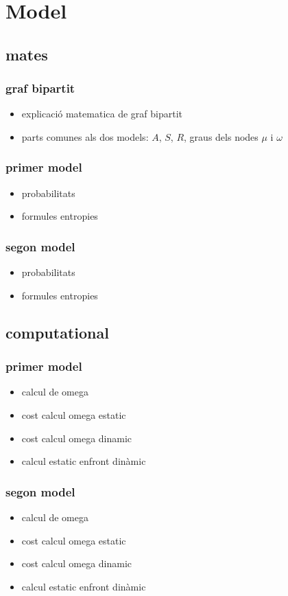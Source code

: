 \chapter{Model}
\section{mates}
\subsection{graf bipartit}
\begin{itemize}
\item explicació matematica de graf bipartit
\item parts comunes als dos models: $A$, $S$, $R$, graus dels nodes $\mu$ i
  $\omega$
\end{itemize}
\subsection{primer model}
\begin{itemize}
\item probabilitats
\item formules entropies
\end{itemize}
\subsection{segon model}
\begin{itemize}
\item probabilitats
\item formules entropies
\end{itemize}
\section{computational}
\subsection{primer model}
\begin{itemize}
\item calcul de omega
\item cost calcul omega estatic
\item cost calcul omega dinamic
\item calcul estatic enfront dinàmic
\end{itemize}
\subsection{segon model}
\begin{itemize}
\item calcul de omega
\item cost calcul omega estatic
\item cost calcul omega dinamic
\item calcul estatic enfront dinàmic
\end{itemize}


